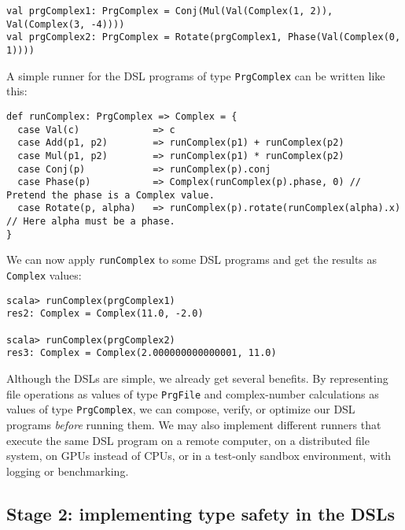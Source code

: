 \begin{lstlisting}
val prgComplex1: PrgComplex = Conj(Mul(Val(Complex(1, 2)), Val(Complex(3, -4))))
val prgComplex2: PrgComplex = Rotate(prgComplex1, Phase(Val(Complex(0, 1))))
\end{lstlisting}
A simple runner for the DSL programs of type \lstinline!PrgComplex!
can be written like this:
\begin{lstlisting}
def runComplex: PrgComplex => Complex = {
  case Val(c)             => c
  case Add(p1, p2)        => runComplex(p1) + runComplex(p2)
  case Mul(p1, p2)        => runComplex(p1) * runComplex(p2)
  case Conj(p)            => runComplex(p).conj
  case Phase(p)           => Complex(runComplex(p).phase, 0) // Pretend the phase is a Complex value.
  case Rotate(p, alpha)   => runComplex(p).rotate(runComplex(alpha).x) // Here alpha must be a phase.
}
\end{lstlisting}
We can now apply \lstinline!runComplex!
to some DSL programs and get the results as \lstinline!Complex!
values:
\begin{lstlisting}
scala> runComplex(prgComplex1)
res2: Complex = Complex(11.0, -2.0)

scala> runComplex(prgComplex2)
res3: Complex = Complex(2.000000000000001, 11.0)
\end{lstlisting}
Although the DSLs are simple, we already get several benefits. By
representing file operations as values of type \lstinline!PrgFile!
and complex-number calculations as values of type \lstinline!PrgComplex!,
we can compose, verify, or optimize our DSL programs \emph{before}
running them. We may also implement different runners that execute
the same DSL program on a remote computer, on a distributed file system,
on GPUs instead of CPUs, or in a test-only sandbox environment, with
logging or benchmarking.

\subsection{Stage 2: implementing type safety in the DSLs}

